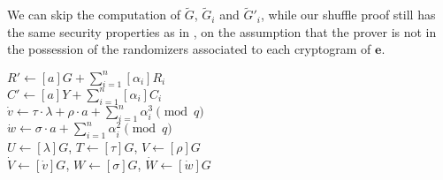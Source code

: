 We can skip the computation of $\tilde{G}$, $\tilde{G}_i$ and $\tilde{G}'_i$, while our shuffle proof still has the same security properties as in \cite{Furukawa01}, on the assumption that the prover is not in the possession of the randomizers associated to each cryptogram of $\boldsymbol{e}$.

\begin{algorithm}[hp]
\DontPrintSemicolon
    \caption{\( \mathbf{ShuffleCommit}_Y (\boldsymbol{e}, \boldsymbol{r'}, \psi, \sigma, \rho, \tau, \lambda, a, \boldsymbol{\alpha}, \boldsymbol{\lambda}) \)}
    \( R' \gets [a]G + \sum_{i=1}^n [\alpha_i]R_i \) \\
    \( C' \gets [a]Y + \sum_{i=1}^n [\alpha_i]C_i \) \\ [2mm]
    \( \dot{v} \gets \tau \cdot \lambda + \rho \cdot a + \sum_{i=1}^n \alpha_i^3 \pmod q \) \\
    \( \dot{w} \gets \sigma \cdot a + \sum_{i=1}^n \alpha_i^2 \pmod q \) \\ [2mm]
    \( U \gets [\lambda]G \), \( T \gets [\tau]G \), \( V \gets [\rho]G \) \\
    \( \dot{V} \gets [\dot{v}]G \), \( W \gets [\sigma]G \), \( \dot{W} \gets [\dot{w}]G \) \\

\end{algorithm}
